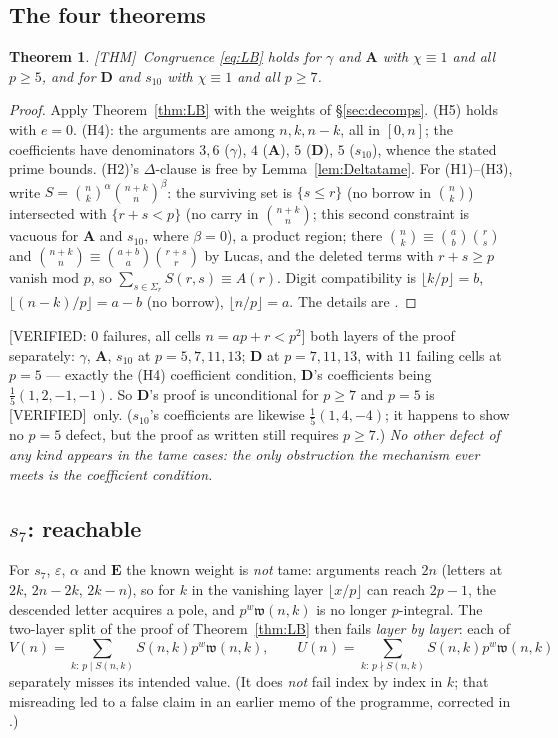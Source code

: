\documentclass[11pt,reqno]{amsart}
\theoremstyle{plain}
\newtheorem{theorem}{Theorem}[section]
\theoremstyle{definition}
\theoremstyle{remark}
\newcommand{\bin}[2]{\binom{#1}{#2}}
\newcommand{\Thm}{\textup{\textsf{[THM]}}}
\newcommand{\Verified}{\textup{\textsf{[VERIFIED]}}}
\newcommand{\VerifiedR}[1]{\textup{\textsf{[VERIFIED: #1]}}}
\numberwithin{equation}{section}
\begin{document}
\subsection{The four theorems}\label{sec:proved}
\begin{theorem}\label{thm:four}
\Thm\ Congruence \eqref{eq:LB} holds for $\gamma$ and $\mathbf A$ with $\chi\equiv1$ and
all $p\ge5$, and for $\mathbf D$ and $s_{10}$ with $\chi\equiv1$ and all $p\ge7$.
\end{theorem}

\begin{proof}
Apply Theorem~\ref{thm:LB} with the weights of \S\ref{sec:decomps}. (H5) holds with $e=0$.
(H4): the arguments are among $n,k,n-k$, all in $[0,n]$; the coefficients have denominators
$3,6$ ($\gamma$), $4$ ($\mathbf A$), $5$ ($\mathbf D$), $5$ ($s_{10}$), whence the stated
prime bounds. (H2)'s $\Delta$-clause is free by Lemma~\ref{lem:Deltatame}. For (H1)--(H3),
write $S=\bin nk^{\alpha}\bin{n+k}n^{\beta}$: the surviving set is $\{s\le r\}$ (no borrow
in $\bin nk$) intersected with $\{r+s<p\}$ (no carry in $\bin{n+k}n$; this second
constraint is vacuous for $\mathbf A$ and $s_{10}$, where $\beta=0$), a product region;
there $\bin nk\equiv\bin ab\bin rs$ and $\bin{n+k}n\equiv\bin{a+b}a\bin{r+s}r$ by Lucas, and
the deleted terms with $r+s\ge p$ vanish mod $p$, so
$\sum_{s\in\Sigma_r}S(r,s)\equiv A(r)$. Digit compatibility is
$\lfloor k/p\rfloor=b$, $\lfloor(n-k)/p\rfloor=a-b$ (no borrow), $\lfloor n/p\rfloor=a$.
The details are \cite[\S3]{CompanionLucas2nd}.
\end{proof}

\VerifiedR{$0$ failures, all cells $n=ap+r<p^2$} both layers of the proof separately:
$\gamma$, $\mathbf A$, $s_{10}$ at $p=5,7,11,13$; $\mathbf D$ at $p=7,11,13$, with $11$
failing cells at $p=5$ --- exactly the (H4) coefficient condition, $\mathbf D$'s
coefficients being $\tfrac15(1,2,-1,-1)$. So $\mathbf D$'s proof is unconditional for
$p\ge7$ and $p=5$ is \Verified\ only. ($s_{10}$'s coefficients are likewise
$\tfrac15(1,4,-4)$; it happens to show no $p=5$ defect, but the proof as written still
requires $p\ge7$.) \emph{No other defect of any kind appears in the tame cases: the only
obstruction the mechanism ever meets is the coefficient condition.}

\subsection{$s_7$: reachable}\label{sec:s7}
For $s_7$, $\varepsilon$, $\alpha$ and $\mathbf E$ the known weight is \emph{not} tame:
arguments reach $2n$ (letters at $2k$, $2n-2k$, $2k-n$), so for $k$ in the vanishing layer
$\lfloor x/p\rfloor$ can reach $2p-1$, the descended letter acquires a pole, and
$p^{w}\mathfrak w(n,k)$ is no longer $p$-integral. The two-layer split of the proof of
Theorem~\ref{thm:LB} then fails \emph{layer by layer}: each of
\[
  V(n)=\!\!\sum_{k:\,p\mid S(n,k)}\!\!S(n,k)p^{w}\mathfrak w(n,k),
  \qquad
  U(n)=\!\!\sum_{k:\,p\nmid S(n,k)}\!\!S(n,k)p^{w}\mathfrak w(n,k)
\]
separately misses its intended value. (It does \emph{not} fail index by index in $k$; that
misreading led to a false claim in an earlier memo of the programme, corrected in
\cite{LemmaDCheck}.)
\end{document}
